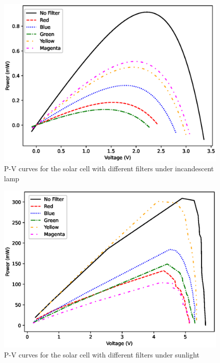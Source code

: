 \begin{figure}
    \centering
    \includegraphics[width=1\columnwidth]{images/in/powers.eps}
    \caption{P-V curves for the solar cell with different filters under incandescent lamp}
\end{figure}

\begin{figure}
    \centering
    \includegraphics[width=1\columnwidth]{images/out/powers.eps}
    \caption{P-V curves for the solar cell with different filters under sunlight}
\end{figure}
